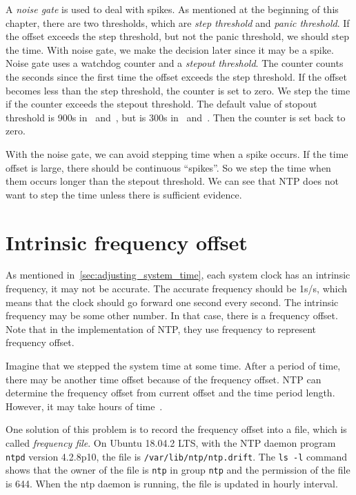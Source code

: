 A \emph{noise gate} is used to deal with spikes. As mentioned at the beginning 
of this chapter, there are two thresholds, which are \emph{step threshold} and 
\emph{panic threshold}. If the offset exceeds the step threshold, but not the
panic threshold, we should step the time. With noise gate, we make the decision
later since it may be a spike. Noise gate uses a watchdog counter and a
\emph{stepout threshold}. The counter counts the seconds since the first time
the offset exceeds the step threshold. If the offset becomes less than the step
threshold, the counter is set to zero. We step the time if the counter exceeds
the stepout threshold. The default value of stopout threshold is 900s
in~\cite{redbook} and~\cite{rfc5905}, but is 300s in~\cite{source_code}
and~\cite{clock_state_machine}. Then the counter is set back to zero.

With the noise gate, we can avoid stepping time when a spike occurs. If the
time offset is large, there should be continuous ``spikes''. So we step the
time when them occurs longer than the stepout threshold. We can see that NTP
does not want to step the time unless there is sufficient evidence.

\section{Intrinsic frequency offset}%
\label{sec:intrinsic_frequency_offset}
As mentioned in~\ref{sec:adjusting_system_time}, each system clock has an
intrinsic frequency, it may not be accurate. The accurate frequency should be
1s/s, which means that the clock should go forward one second every second. The
intrinsic frequency may be some other number. In that case, there is a
frequency offset. Note that in the implementation of NTP\null, they use
frequency to represent frequency offset. 

Imagine that we stepped the system time at some time. After a period of time,
there may be another time offset because of the frequency offset. NTP can
determine the frequency offset from current offset and the time period length.
However, it may take hours of time~\cite{redbook}. 

One solution of this problem is to record the frequency offset into a file,
which is called \emph{frequency file}. On Ubuntu 18.04.2 LTS, with the NTP
daemon program \verb|ntpd| version 4.2.8p10, the file is
\verb|/var/lib/ntp/ntp.drift|. The \verb|ls -l| command shows that the owner of
the file is \verb|ntp| in group \verb|ntp| and the permission of the file is
644. When the ntp daemon is running, the file is updated in hourly interval.


